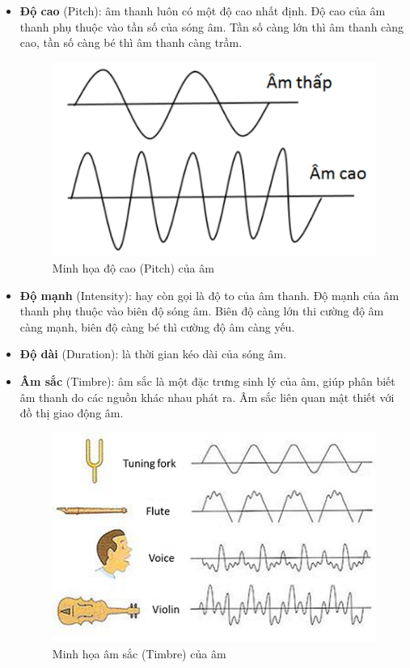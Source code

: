 \begin{itemize}
	\item \textbf{Độ cao} (Pitch): âm thanh luôn có một độ cao nhất định. Độ cao của âm thanh phụ thuộc vào tần số của sóng âm. Tần số càng lớn thì âm thanh càng cao, tần số càng bé thì âm thanh càng trầm.

	\begin{figure}[h]
		\centering
		\includegraphics[scale=1]{pitch}
		\caption{Minh họa độ cao (Pitch) của âm}
		\label{fig:c2_pitch}
	\end{figure}

	\item \textbf{Độ mạnh} (Intensity): hay còn gọi là độ to của âm thanh. Độ mạnh của âm thanh phụ thuộc vào biên độ sóng âm. Biên độ càng lớn thi cường độ âm càng mạnh, biên độ càng bé thì cường độ âm càng yếu.
	\item \textbf{Độ dài} (Duration): là thời gian kéo dài của sóng âm.
	\item \textbf{Âm sắc} (Timbre): âm sắc là một đặc trưng sinh lý của âm, giúp phân biết âm thanh do các nguồn khác nhau phát ra. Âm sắc liên quan mật thiết với đồ thị giao động âm.
	\begin{figure}[h]
		\centering
		\includegraphics[scale=1]{timbre}
		\caption{Minh họa âm sắc (Timbre) của âm}
		\label{fig:c2_timbre}
	\end{figure}
\end{itemize}

